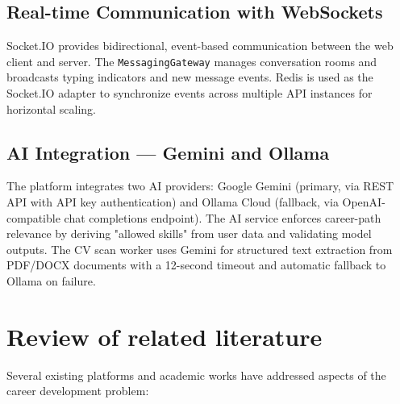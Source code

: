 \documentclass[12pt,a4paper]{report}
\begin{document}
\subsection{Real-time Communication with WebSockets}
Socket.IO provides bidirectional, event-based communication between the web client and server. The \texttt{MessagingGateway} manages conversation rooms and broadcasts typing indicators and new message events. Redis is used as the Socket.IO adapter to synchronize events across multiple API instances for horizontal scaling.

\subsection{AI Integration — Gemini and Ollama}
The platform integrates two AI providers: Google Gemini (primary, via REST API with API key authentication) and Ollama Cloud (fallback, via OpenAI-compatible chat completions endpoint). The AI service enforces career-path relevance by deriving "allowed skills" from user data and validating model outputs. The CV scan worker uses Gemini for structured text extraction from PDF/DOCX documents with a 12-second timeout and automatic fallback to Ollama on failure.

\section{Review of related literature}

Several existing platforms and academic works have addressed aspects of the career development problem:
\end{document}
